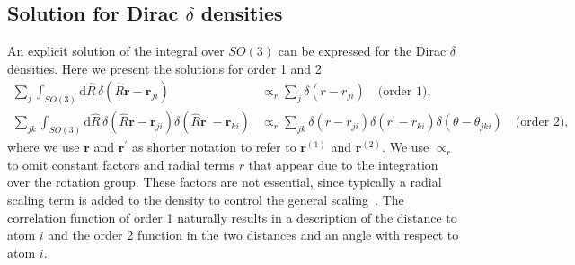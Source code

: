 \subsection{Solution for Dirac $\delta$ densities}

An explicit solution of the integral over $SO(3)$ can be expressed for the Dirac $\delta$ densities.
Here we present the solutions for order 1 and 2 
\begin{subequations}
\label{eq:dirac_delta_haar_integral}
\begin{align}
    \label{eq:dirac_delta_haar_integral_2body}
    \sum_j \int_{SO(3)} \mathrm{d}\hat{R}\, \delta(\hat{R}\mathbf{r}-\mathbf{r}_{ji}) &\propto_r \sum_j \delta(r-r_{ji})\quad\textrm{(order 1)},  \\%
    \label{eq:dirac_delta_haar_integral_3body}
    \sum_{jk}\int_{SO(3)} \mathrm{d}\hat{R}\, \delta(\hat{R}\mathbf{r}-\mathbf{r}_{ji}) \delta(\hat{R}\mathbf{r}^\prime-\mathbf{r}_{ki}) &\propto_r \sum_{jk}\delta(r-r_{ji})\delta(r^\prime-r_{ki})\delta(\theta -\theta_{jki})\quad\textrm{(order 2)}, %
\end{align}
\end{subequations}
where we use $\mathbf{r}$ and $\mathbf{r}^\prime$ as shorter notation to refer to $\mathbf{r}^{(1)}$ and $\mathbf{r}^{(2)}$.
We use $\propto_r$ to omit constant factors and radial terms $r$ that appear due to the integration over the rotation group.
These factors are not essential, since typically a radial scaling term is added to the density to control the general scaling~\cite{behl11jcp,huan-vonl16jcp,will+18pccp,drautz2019atomic}.
The correlation function of order 1 naturally results in a description of the distance to atom $i$ and the order 2 function in the two distances and an angle with respect to atom $i$.
